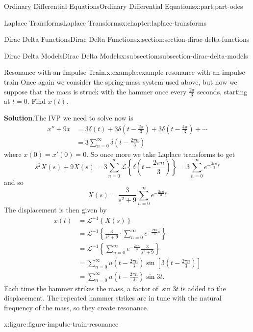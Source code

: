 \documentclass[twoside,10pt,]{book}
\newcommand{\blocktitlefont}{\relax}
\numberwithin{equation}{part}
\newcommand{\Sum}[2]{\sum_{#1}^{#2}}
\newcommand{\Laplace}[1]{\mathcal{L}\left\{#1\right\}}
\newcommand{\iLaplace}[1]{\mathcal{L}^{-1}\left\{#1\right\}}
\newcommand{\amp}{&}
\begin{document}
\begin{partptx}{Ordinary Differential Equations}{}{Ordinary Differential Equations}{}{}{x:part:part-odes}
\begin{chapterptx}{Laplace Transforms}{}{Laplace Transforms}{}{}{x:chapter:laplace-transforms}
\begin{sectionptx}{Dirac Delta Functions}{}{Dirac Delta Functions}{}{}{x:section:section-dirac-delta-functions}
\begin{subsectionptx}{Dirac Delta Models}{}{Dirac Delta Models}{}{}{x:subsection:subsection-dirac-delta-models}
\begin{example}{Resonance with an Impulse Train.}{x:example:example-resonance-with-an-impulse-train}
Once again we consider the spring-mass system used above, but now we suppose that the mass is struck with the hammer once every \(\frac{2\pi}{3}\) seconds, starting at \(t=0\). Find \(x(t)\).%
\par\smallskip%
\noindent\textbf{\blocktitlefont Solution}.\hypertarget{g:solution:idp105548816702880}{}\quad{}The IVP we need to solve now is%
\begin{align*}
x''+9x \amp= 3\delta(t)+3\delta(t-\frac{2\pi}{3}) + 3\delta(t-\frac{4\pi}{3}) +\cdots\\
\amp= 3\Sum{n=0}{\infty}\delta(t-\frac{2\pi n}{3})
\end{align*}
where \(x(0) = x'(0) = 0\). So once more we take Laplace transforms to get%
\begin{equation*}
s^{2}X(s)+9X(s) = 3\Sum{n=0}{\infty}\Laplace{\delta(t-\frac{2\pi n}{3})} = 3\Sum{n=0}{\infty}e^{-\frac{2\pi n}{3}s}
\end{equation*}
and so%
\begin{equation*}
X(s) = \frac{3}{s^{2}+9}\Sum{n=0}{\infty}e^{-\frac{2\pi n}{3}s}
\end{equation*}
The displacement is then given by%
\begin{align*}
x(t) \amp= \iLaplace{X(s)}\\
\amp= \iLaplace{\frac{3}{s^{2}+9}\cdot\Sum{n=0}{\infty}e^{-\frac{2\pi n}{3}s}}\\
\amp= \iLaplace{\Sum{n=0}{\infty}e^{-\frac{2\pi n}{3}}\frac{3}{s^{2}+9}}\\
\amp= \Sum{n=0}{\infty}u(t-\frac{2\pi n}{3})\sin[3(t-\frac{2\pi n}{3})]\\
\amp= \Sum{n=0}{\infty}u(t-\frac{2\pi n}{3})\sin3t\text{.}
\end{align*}
Each time the hammer strikes the mass, a factor of \(\sin3t\) is added to the displacement. The repeated hammer strikes are in tune with the natural frequency of the mass, so they create resonance.%
\end{example}
\begin{figureptx}{}{x:figure:figure-impulse-train-resonance}{}%
\begin{image}{0}{1}{0}%
\end{image}
\end{figureptx}
\end{subsectionptx}
\end{sectionptx}
\end{chapterptx}
\end{partptx}
\end{document}
